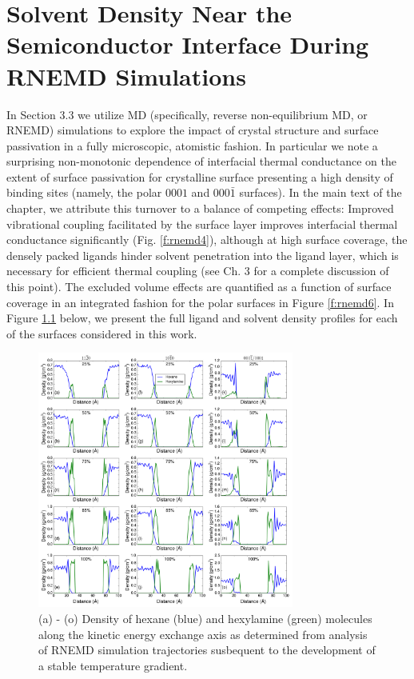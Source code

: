 \chapter{Solvent Density Near the Semiconductor Interface During RNEMD Simulations}

In Section 3.3 we utilize MD (specifically, reverse non-equilibrium MD, or RNEMD) simulations to explore the impact of crystal structure and surface passivation in a fully microscopic, atomistic fashion. In particular we note a surprising non-monotonic dependence of interfacial thermal conductance on the extent of surface passivation for crystalline surface presenting a high density of binding sites (namely, the polar $0001$ and $000\bar{1}$ surfaces). In the main text of the chapter, we attribute this turnover to a balance of competing effects: Improved vibrational coupling facilitated by the surface layer improves interfacial thermal conductance significantly (Fig. \ref{f:rnemd4}), although at high surface coverage, the densely packed ligands hinder solvent penetration into the ligand layer, which is necessary for efficient thermal coupling (see Ch. 3 for a complete discussion of this point). The excluded volume effects are quantified as a function of surface coverage in an integrated fashion for the polar surfaces in Figure \ref{f:rnemd6}. In Figure \ref{f:densprof1} below, we present the full ligand and solvent density profiles for each of the surfaces considered in this work. \par

\begin{figure}
\begin{center}
\includegraphics[width=0.75\textwidth]{./appendixE/densprof1.png}
\caption[Ligand and solvent density profiles along the kinetic energy exchange axis for each of the surfaces addressed in Chapter 3 as a function of surface coverage.]{(a) - (o) Density of hexane (blue) and hexylamine (green) molecules along the kinetic energy exchange axis as determined from analysis of RNEMD simulation trajectories susbequent to the development of a stable temperature gradient.}
\label{f:densprof1}
\end{center}
\end{figure}

